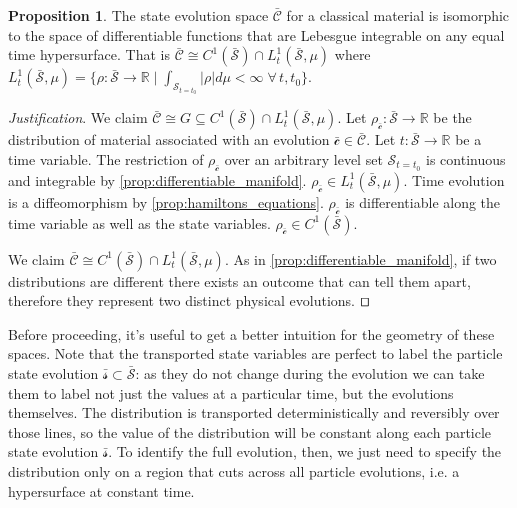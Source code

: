 \documentclass[smallextended]{svjour3}
\numberwithin{equation}{section}
\newenvironment{justification}{\emph{Justification}.}{\hfill\(\qed\)}
\theoremstyle{definition}
\newtheorem{prop}[equation]{Proposition}
\newenvironment{justification}{\emph{Justification}.}{\qed}
\begin{document}
\begin{prop}\label{prop:state_evolution_space}
	The state evolution space $\bar{\mathcal{C}}$ for a classical material is isomorphic to the space of differentiable functions that are Lebesgue integrable on any equal time hypersurface. That is $\bar{\mathcal{C}} \cong  C^1(\bar{\mathcal{S}})\cap L^1_t(\bar{\mathcal{S}}, \mu)$ where $L^1_t(\bar{\mathcal{S}}, \mu)=\{{\rho: \bar{\mathcal{S}} \rightarrow \mathbb{R}} \; | \; {\int_{\mathcal{S}_{t=t_0}} |\rho| d\mu < \infty} \; \forall \, t, t_0 \}$.
\end{prop}

\begin{justification}
	We claim $\bar{\mathcal{C}} \cong  G \subseteq C^1(\bar{\mathcal{S}})\cap L^1_t(\bar{\mathcal{S}}, \mu)$. Let $\rho_{\bar{\mathcal{c}}} : \bar{\mathcal{S}} \rightarrow \mathbb{R}$ be the distribution of material associated with an evolution $\bar{\mathcal{c}} \in \bar{\mathcal{C}}$. Let $t : \bar{\mathcal{S}} \rightarrow \mathbb{R}$ be a time variable. 
	The restriction of $\rho_{\bar{\mathcal{c}}}$ over an arbitrary level set $\mathcal{S}_{t=t_0}$ is continuous and integrable by \ref{prop:differentiable_manifold}. $\rho_{\bar{\mathcal{c}}} \in L^1_t(\bar{\mathcal{S}}, \mu)$. Time evolution is a diffeomorphism by \ref{prop:hamiltons_equations}. $\rho_{\bar{\mathcal{c}}}$ is differentiable along the time variable as well as the state variables. $\rho_{\bar{\mathcal{c}}} \in C^1(\bar{\mathcal{S}})$.
	
	We claim $\bar{\mathcal{C}} \cong  C^1(\bar{\mathcal{S}})\cap L^1_t(\bar{\mathcal{S}}, \mu)$. As in \ref{prop:differentiable_manifold}, if two distributions are different there exists an outcome that can tell them apart, therefore they represent two distinct physical evolutions.
\end{justification}

Before proceeding, it's useful to get a better intuition for the geometry of these spaces. Note that the transported state variables are perfect to label the particle state evolution $\bar{\mathcal{s}} \subset \bar{\mathcal{S}}$: as they do not change during the evolution we can take them to label not just the values at a particular time, but the evolutions themselves. The distribution is transported deterministically and reversibly over those lines, so the value of the distribution will be constant along each particle state evolution $\bar{\mathcal{s}}$. To identify the full evolution, then, we just need to specify the distribution only on a region that cuts across all particle evolutions, i.e. a hypersurface at constant time.
\end{document}
